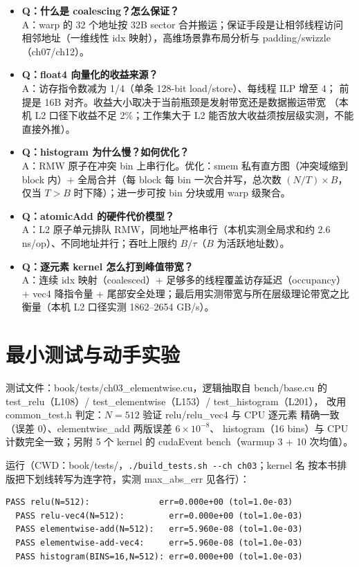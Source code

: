 \begin{itemize}
\item \textbf{Q：什么是 coalescing？怎么保证？}\\
  A：warp 的 32 个地址按 32B sector 合并搬运；保证手段是让相邻线程访问
  相邻地址（一维线性 idx 映射），高维场景靠布局分析与 padding/swizzle
  （ch07/ch12）。
\item \textbf{Q：float4 向量化的收益来源？}\\
  A：访存指令数减为 1/4（单条 128-bit load/store）、每线程 ILP 增至 4；
  前提是 16B 对齐。收益大小取决于当前瓶颈是发射带宽还是数据搬运带宽
  （本机 L2 口径下收益不足 2\%；工作集大于 L2 能否放大收益须按层级实测，不能直接外推）。
\item \textbf{Q：histogram 为什么慢？如何优化？}\\
  A：RMW 原子在冲突 bin 上串行化。优化：smem 私有直方图（冲突域缩到
  block 内）+ 全局合并（每 block 每 bin 一次合并写，总次数 $(N/T) \times B$，
  仅当 $T > B$ 时下降）；进一步可按 bin 分块或用 warp 级聚合。
\item \textbf{Q：atomicAdd 的硬件代价模型？}\\
  A：L2 原子单元排队 RMW，同地址严格串行（本机实测全局求和约
  2.6 ns/op）、不同地址并行；吞吐上限约 $B/\tau$（$B$ 为活跃地址数）。
\item \textbf{Q：逐元素 kernel 怎么打到峰值带宽？}\\
  A：连续 idx 映射（coalesced）+ 足够多的线程覆盖访存延迟（occupancy）
  + vec4 降指令量 + 尾部安全处理；最后用实测带宽与所在层级理论带宽之比
  衡量（本机 L2 口径实测 1862--2654 GB/s）。
\end{itemize}

\section{最小测试与动手实验}

测试文件：book/tests/ch03\_elementwise.cu，逻辑抽取自 bench/base.cu 的
test\_relu（L108）/ test\_elementwise（L153）/ test\_histogram（L201），
改用 common\_test.h 判定：$N = 512$ 验证 relu/relu\_vec4 与 CPU 逐元素
精确一致（误差 0）、elementwise\_add 两版误差 $6 \times 10^{-8}$、
histogram（16 bins）与 CPU 计数完全一致；另附 5 个 kernel 的 cudaEvent
bench（warmup 3 + 10 次均值）。

运行（CWD：book/tests/，\texttt{.\allowbreak{}/\allowbreak{}build\_\allowbreak{}tests.\allowbreak{}sh -{}-ch ch03}；kernel 名
按本书排版把下划线转写为连字符，实测 max\_abs\_err 见各行）：
\begin{lstlisting}[style=console]
  PASS relu(N=512):              err=0.000e+00 (tol=1.0e-03)
  PASS relu-vec4(N=512):         err=0.000e+00 (tol=1.0e-03)
  PASS elementwise-add(N=512):   err=5.960e-08 (tol=1.0e-03)
  PASS elementwise-add-vec4:     err=5.960e-08 (tol=1.0e-03)
  PASS histogram(BINS=16,N=512): err=0.000e+00 (tol=1.0e-03)
\end{lstlisting}

